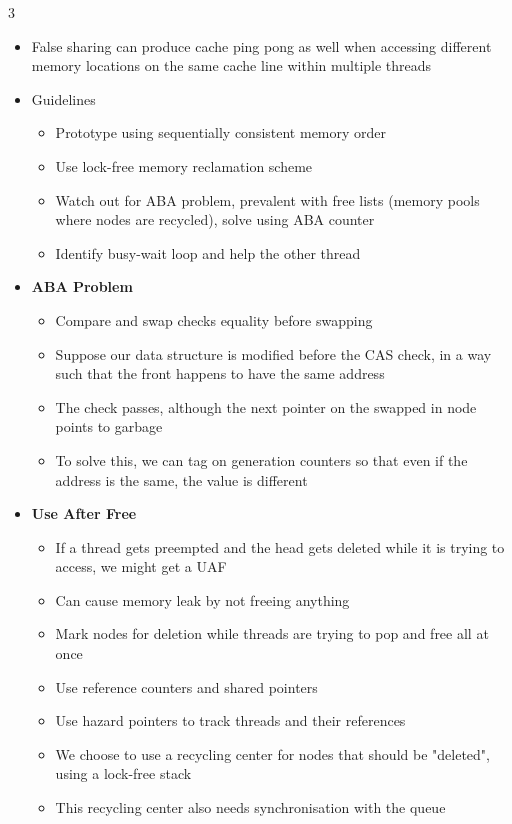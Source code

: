 \documentclass[10pt, landscape]{article}
\begin{document}
\begin{multicols*}{3}
\begin{itemize}
    \item False sharing can produce cache ping pong as well when accessing different memory locations on the same cache line within multiple threads
    \item Guidelines
    \begin{itemize}
        \item Prototype using sequentially consistent memory order
        \item Use lock-free memory reclamation scheme
        \item Watch out for ABA problem, prevalent with free lists (memory pools where nodes are recycled), solve using ABA counter
        \item Identify busy-wait loop and help the other thread
    \end{itemize}
    \item \textbf{ABA Problem}
    \begin{itemize}
        \item Compare and swap checks equality before swapping
        \item Suppose our data structure is modified before the CAS check, in a way such that the front happens to have the same address
        \item The check passes, although the next pointer on the swapped in node points to garbage
        \item To solve this, we can tag on generation counters so that even if the address is the same, the value is different
    \end{itemize}
    \item \textbf{Use After Free}
    \begin{itemize}
        \item If a thread gets preempted and the head gets deleted while it is trying to access, we might get a UAF
        \item Can cause memory leak by not freeing anything
        \item Mark nodes for deletion while threads are trying to pop and free all at once
        \item Use reference counters and shared pointers
        \item Use hazard pointers to track threads and their references
        \item We choose to use a recycling center for nodes that should be "deleted", using a lock-free stack
        \item This recycling center also needs synchronisation with the queue

\end{itemize}
\end{itemize}
\end{multicols*}
\end{document}
